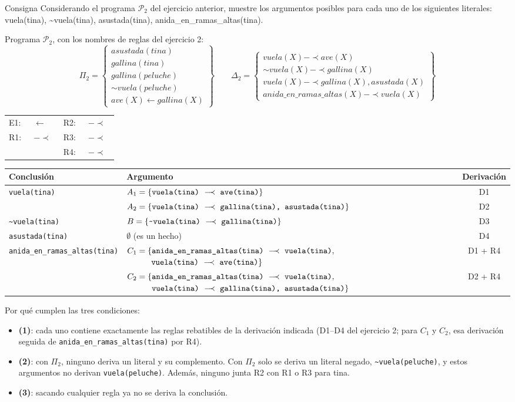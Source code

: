 \documentclass[11pt,a4paper]{article}
\makeatletter
\newcommand{\nf}{\textasciitilde}                 %
\newcommand{\reb}{\mathrel{-\!\!\!\prec}}         %
\newcommand{\est}{\leftarrow}                      %
\newcommand{\regla}[3]{\text{\texttt{#1}}~\ensuremath{#2}~\text{\texttt{#3}}}
\newcommand{\programaPdos}{%
\[
\Pi_2 = \left\{\begin{array}{l}
\mathit{asustada(tina)} \\
\mathit{gallina(tina)} \\
\mathit{gallina(peluche)} \\
\sim\mathit{vuela(peluche)} \\
\mathit{ave(X)} \est \mathit{gallina(X)}
\end{array}\right\}
\qquad
\Delta_2 = \left\{\begin{array}{l}
\mathit{vuela(X)} \reb \mathit{ave(X)} \\
\sim\mathit{vuela(X)} \reb \mathit{gallina(X)} \\
\mathit{vuela(X)} \reb \mathit{gallina(X), asustada(X)} \\
\mathit{anida\_en\_ramas\_altas(X)} \reb \mathit{vuela(X)}
\end{array}\right\}
\]}
\newcommand{\reglasPdos}{%
\begin{center}
\small
\begin{tabular}{@{}ll@{\qquad}ll@{}}
E1: & \regla{ave(X)}{\est}{gallina(X)} & R2: & \regla{\nf vuela(X)}{\reb}{gallina(X)} \\
R1: & \regla{vuela(X)}{\reb}{ave(X)} & R3: & \regla{vuela(X)}{\reb}{gallina(X), asustada(X)} \\
 & & R4: & \regla{anida\_en\_ramas\_altas(X)}{\reb}{vuela(X)} \\
\end{tabular}
\end{center}}
\makeatother
\begin{document}
\begin{enunciado}{Consigna}
Considerando el programa $\mathcal{P}_2$ del ejercicio anterior, muestre los argumentos posibles para cada uno de los siguientes literales: vuela(tina), \nf vuela(tina), asustada(tina), anida\_en\_ramas\_altas(tina).
\end{enunciado}

Programa $\mathcal{P}_2$, con los nombres de reglas del ejercicio 2:
\programaPdos
\reglasPdos

\begin{center}
\footnotesize
\begin{tabularx}{\linewidth}{@{}l >{\raggedright\arraybackslash}X c@{}}
\toprule
\textbf{Conclusión} & \textbf{Argumento} & \textbf{Derivación} \\
\midrule
\texttt{vuela(tina)} & $A_1 = \{\regla{vuela(tina)}{\reb}{ave(tina)}\}$ & D1 \\
 & $A_2 = \{\regla{vuela(tina)}{\reb}{gallina(tina), asustada(tina)}\}$ & D2 \\
\midrule
\texttt{\nf vuela(tina)} & $B = \{\regla{\nf vuela(tina)}{\reb}{gallina(tina)}\}$ & D3 \\
\midrule
\texttt{asustada(tina)} & $\emptyset$ (es un hecho) & D4 \\
\midrule
\texttt{anida\_en\_ramas\_altas(tina)} & $C_1 = \{\regla{anida\_en\_ramas\_altas(tina)}{\reb}{vuela(tina)},$\newline $\phantom{C_1 = \{}\regla{vuela(tina)}{\reb}{ave(tina)}\}$ & D1 + R4 \\
 & $C_2 = \{\regla{anida\_en\_ramas\_altas(tina)}{\reb}{vuela(tina)},$\newline $\phantom{C_2 = \{}\regla{vuela(tina)}{\reb}{gallina(tina), asustada(tina)}\}$ & D2 + R4 \\
\bottomrule
\end{tabularx}
\end{center}

Por qué cumplen las tres condiciones:
\begin{itemize}
  \item \textbf{(1)}: cada uno contiene exactamente las reglas rebatibles de la derivación indicada (D1--D4 del ejercicio 2; para $C_1$ y $C_2$, esa derivación seguida de \texttt{anida\_en\_ramas\_altas(tina)} por R4).
  \item \textbf{(2)}: con $\Pi_2$, ninguno deriva un literal y su complemento. Con $\Pi_2$ solo se deriva un literal negado, \texttt{\nf vuela(peluche)}, y estos argumentos no derivan \texttt{vuela(peluche)}. Además, ninguno junta R2 con R1 o R3 para tina.
  \item \textbf{(3)}: sacando cualquier regla ya no se deriva la conclusión.
\end{itemize}
\end{document}
